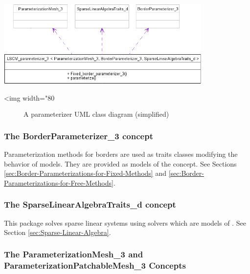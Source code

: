 \begin{center}
    \label{Surface_mesh_parameterization-fig-parameterizer_class_diagram_simplified}
    \begin{ccTexOnly}
        \includegraphics[width=0.80\textwidth]{Surface_mesh_parameterization/parameterizer_class_diagram_simplified} %
    \end{ccTexOnly}
    \begin{ccHtmlOnly}
        <img width="80%
    \end{ccHtmlOnly}
    \begin{figure}[h]
        \caption{A parameterizer UML class diagram (simplified)}
    \end{figure}
\end{center}


\subsubsection{The BorderParameterizer\_3 concept}

Parameterization methods for
borders are used as traits classes modifying the behavior of
 models.
They are provided as models of the  concept.
See Sections \ref{sec:Border-Parameterizations-for-Fixed-Methods}
and \ref{sec:Border-Parameterizations-for-Free-Methods}.


\subsubsection{The SparseLinearAlgebraTraits\_d concept}

This package solves sparse linear systems using solvers which are models
of .
See Section \ref{sec:Sparse-Linear-Algebra}.


\subsubsection{The ParameterizationMesh\_3 and ParameterizationPatchableMesh\_3 Concepts}

